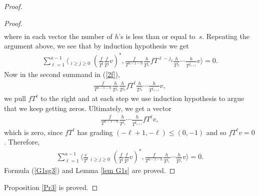 \documentclass[11pt]{article}
\numberwithin{equation}{section}
\begin{document}
\begin{proof}
\begin{proof}
\begin{gather*}
\end{gather*}
where in each vector the number of $h$'s is less than or equal to~$s$. Repeating the argument above, we see that by induction hypothesis we get
\begin{gather*}
\sum_{\ell=1}^{a-1} \bigg\langle \mathop{\sum_{i+j=a-1-\ell}}_{i\geq j\geq 0} \left(\frac{f}{T^i}\frac{f}{T^j}v\right)^*, \frac{f}{T^{a-1-n}} \frac{h}{T^{j_1}} fT^{\ell-j_2} \frac{h}{T^{j_3}} \cdots \frac{h}{T^{j_{s+1}}} v \bigg\rangle = 0.
\end{gather*}
Now in the second summand in (\ref{2f}),
\begin{gather*}
\frac{f}{T^{a-1-n}} \frac{h}{T^{j_1}} \frac{h}{T^{j_2}} fT^{\ell} \frac{h}{T^{j_3}} \cdots \frac{h}{T^{j_{s+1}}} v,
\end{gather*}
we pull $fT^{\ell}$ to the right and at each step we use induction hypothesis to argue that we keep getting zeros. Ultimately, we get a vector
\begin{gather*}
\frac{f}{T^{a-1-n}} \frac{h}{T^{j_1}} \cdots \frac{h}{T^{j_{s+1}}} fT^{\ell} v,
\end{gather*}
which is zero, since $fT^{\ell}$ has grading $(-\ell+1, -\ell) \leq (0,-1)$ and so $fT^{\ell}v=0$. Therefore,
\begin{gather*}
\sum_{\ell=1}^{a-1} \bigg\langle \frac{e}{T^{\ell}} \mathop{\sum_{i+j=a-1-\ell}}_{i\geq j\geq 0} \left(\frac{f}{T^i}\frac{f}{T^j}v\right)^*, \frac{f}{T^{a-1-n}} \frac{h}{T^{j_1}} \cdots \frac{h}{T^{j_{s}}} v \bigg\rangle = 0.
\end{gather*}
Formula (\ref{G1sg3}) and Lemma \ref{lem G1s} are proved.
\end{proof}
Proposition \ref{Pr3} is proved.
\end{proof}
\end{document}
